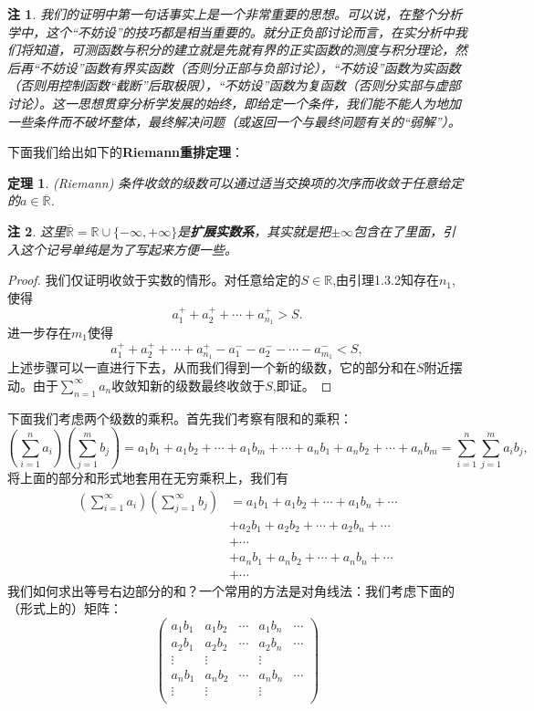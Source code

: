 \documentclass{article}
\newtheorem{theorem}{定理}[subsection]
\newtheorem{note}{注}[subsection]
\begin{document}
\begin{note}
我们的证明中第一句话事实上是一个非常重要的思想。可以说，在整个分析学中，这个“不妨设”的技巧都是相当重要的。就分正负部讨论而言，在实分析中我们将知道，可测函数与积分的建立就是先就有界的正实函数的测度与积分理论，然后再“不妨设”函数有界实函数（否则分正部与负部讨论），“不妨设”函数为实函数（否则用控制函数“截断”后取极限），“不妨设”函数为复函数（否则分实部与虚部讨论）。这一思想贯穿分析学发展的始终，即给定一个条件，我们能不能人为地加一些条件而不破坏整体，最终解决问题（或返回一个与最终问题有关的“弱解”）。
\end{note}
下面我们给出如下的\textbf{Riemann重排定理}：
\begin{theorem}(Riemann)
条件收敛的级数可以通过适当交换项的次序而收敛于任意给定的$a\in\overline{\mathbb{R}}$.
\end{theorem}
\begin{note}
这里$\overline{\mathbb{R}}=\mathbb{R}\cup\{-\infty,+\infty\}$是\textbf{扩展实数系}，其实就是把$\pm\infty$包含在了里面，引入这个记号单纯是为了写起来方便一些。
\end{note}
\begin{proof}
我们仅证明收敛于实数的情形。对任意给定的$S\in\mathbb{R}$,由引理1.3.2知存在$n_1$,使得
$$a_{1}^{+}+a_{2}^{+}+\cdots +a_{n_1}^{+}>S.$$进一步存在$m_1$使得
$$a_{1}^{+}+a_{2}^{+}+\cdots +a_{n_1}^{+}-a_{1}^{-}-a_{2}^{-}-\cdots -a_{m_1}^{-}<S,$$
上述步骤可以一直进行下去，从而我们得到一个新的级数，它的部分和在$S$附近摆动。由于$\sum_{n=1}^\infty a_n$收敛知新的级数最终收敛于$S$,即证。
\end{proof}
下面我们考虑两个级数的乘积。首先我们考察有限和的乘积：
$$
\left( \sum_{i=1}^n{a_i} \right) \left( \sum_{j=1}^m{b_j} \right) =a_1b_1+a_1b_2+\cdots +a_1b_m+\cdots +a_nb_1+a_nb_2+\cdots +a_nb_m=\sum_{i=1}^n{\sum_{j=1}^m{a_ib_j}},
$$
将上面的部分和形式地套用在无穷乘积上，我们有
$$
\begin{aligned}
\left( \sum_{i=1}^{\infty}{a_i} \right) \left( \sum_{j=1}^{\infty}{b_j} \right) &=a_1b_1+a_1b_2+\cdots +a_1b_n+\cdots 
\\
&+a_2b_1+a_2b_2+\cdots +a_2b_n+\cdots 
\\
&+\cdots 
\\
&+a_nb_1+a_nb_2+\cdots +a_nb_n+\cdots 
\\
&+\cdots 
\end{aligned}
$$
我们如何求出等号右边部分的和？一个常用的方法是对角线法：我们考虑下面的（形式上的）矩阵：
$$
\left( \begin{matrix}
	a_1b_1&		a_1b_2&		\cdots&		a_1b_n&		\cdots\\
	a_2b_1&		a_2b_2&		\cdots&		a_2b_n&		\cdots\\
	\vdots&		\vdots&		&		\vdots&		\\
	a_nb_1&		a_nb_2&		\cdots&		a_nb_n&		\cdots\\
	\vdots&		\vdots&		&		\vdots&		\\
\end{matrix} \right) 
$$
\end{document}
